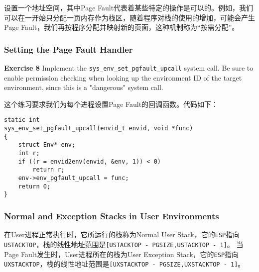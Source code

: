 \documentclass[11pt]{article}
\begin{document}
设置一个地址空间，其中Page Fault代表着某些特定的操作是可以的。例如，我们可以在一开始只分配一页内存作为栈区，随着程序对栈的使用的增加，可能会产生Page Fault，我们再按程序分配并映射新的页面，这种机制称为“按需分配”。

\subsubsection{Setting the Page Fault Handler}
\begin{framed}
\noindent\textbf{Exercise 8} Implement the \lstinline|sys_env_set_pgfault_upcall| system call. Be sure to enable permission checking when looking up the environment ID of the target environment, since this is a "dangerous" system call.
\end{framed}
这个练习要求我们为每个进程设置Page Fault的回调函数。代码如下：
\begin{lstlisting}[title=kern/syscall.c]
static int
sys_env_set_pgfault_upcall(envid_t envid, void *func)
{
	struct Env* env;
	int r;
	if ((r = envid2env(envid, &env, 1)) < 0)
		return r;
	env->env_pgfault_upcall = func;
	return 0;
}
\end{lstlisting}

\subsubsection{Normal and Exception Stacks in User Environments}
在User进程正常执行时，它所运行的栈称为Normal User Stack，它的\lstinline|ESP|指向\lstinline|USTACKTOP|，栈的线性地址范围是\lstinline|[USTACKTOP - PGSIZE,USTACKTOP - 1]|。
当Page Fault发生时，User进程所在的栈为User Exception Stack，它的\lstinline|ESP|指向\lstinline|UXSTACKTOP|，栈的线性地址范围是\lstinline|[UXSTACKTOP - PGSIZE,UXSTACKTOP - 1]|。
\end{document}
